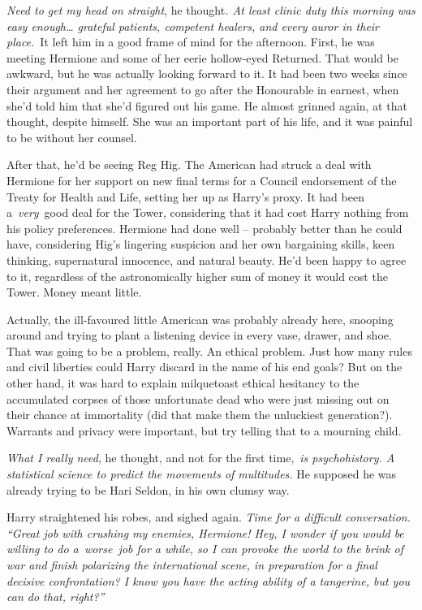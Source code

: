 \emph{Need to get my head on straight}, he thought\emph{. At least
clinic duty this morning was easy enough\ldots{} grateful patients,
competent healers, and every auror in their place.}~It left him in a
good frame of mind for the afternoon. First, he was meeting Hermione and
some of her eerie hollow-eyed Returned. That would be awkward, but he
was actually looking forward to it. It had been two weeks since their
argument and her agreement to go after the Honourable in earnest, when
she'd told him that she'd figured out his game. He almost grinned again,
at that thought, despite himself. She was an important part of his life,
and it was painful to be without her counsel.

After that, he'd be seeing Reg Hig. The American had struck a deal with
Hermione for her support on new final terms for a Council endorsement of
the Treaty for Health and Life, setting her up as Harry's proxy. It had
been a~\emph{very}~good deal for the Tower, considering that it had cost
Harry nothing from his policy preferences. Hermione had done well --
probably better than he could have, considering Hig's lingering
suspicion and her own bargaining skills, keen thinking, supernatural
innocence, and natural beauty. He'd been happy to agree to it,
regardless of the astronomically higher sum of money it would cost the
Tower. Money meant little.

Actually, the ill-favoured little American was probably already here,
snooping around and trying to plant a listening device in every vase,
drawer, and shoe. That was going to be a problem, really. An ethical
problem. Just how many rules and civil liberties could Harry discard in
the name of his end goals? But on the other hand, it was hard to explain
milquetoast ethical hesitancy to the accumulated corpses of those
unfortunate dead who were just missing out on their chance at
immortality (did that make them the unluckiest generation?). Warrants
and privacy were important, but try telling that to a mourning child.

\emph{What I really need}, he thought, and not for the first
time,~\emph{is psychohistory. A statistical science to predict the
movements of multitudes.} He supposed he was already trying to be Hari
Seldon, in his own clumsy way.

Harry straightened his robes, and sighed again. \emph{Time for a
difficult conversation. ``Great job with crushing my enemies, Hermione!
Hey, I wonder if you would be willing to do a\emph{~worse~}job for a
while, so I can provoke the world to the brink of war and finish
polarizing the international scene, in preparation for a final decisive
confrontation? I know you have the acting ability of a tangerine, but
you can do that, right?''}

